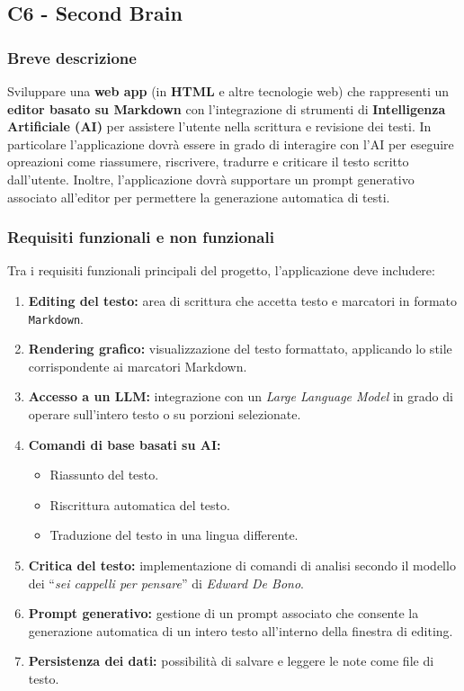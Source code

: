 \documentclass[a4paper,11pt]{article}
\begin{document}
\subsection{C6 - Second Brain}

\subsubsection{Breve descrizione}
Sviluppare una \textbf{web app} (in \textbf{HTML} e altre tecnologie web) che rappresenti un \textbf{editor basato su Markdown} con l’integrazione di strumenti di \textbf{Intelligenza Artificiale (AI)} per assistere l’utente nella scrittura e revisione dei testi.
In particolare l'applicazione dovrà essere in grado di interagire con l'AI per eseguire opreazioni come riassumere, riscrivere, tradurre e criticare il testo scritto dall'utente. Inoltre, l'applicazione dovrà supportare un prompt generativo associato all'editor per permettere la generazione automatica di testi.
\subsubsection{Requisiti funzionali e non funzionali}
Tra i requisiti funzionali principali del progetto, l'applicazione deve includere:
\begin{enumerate}[noitemsep, topsep=0pt]
  \item \textbf{Editing del testo:} area di scrittura che accetta testo e marcatori in formato \texttt{Markdown}.
  \item \textbf{Rendering grafico:} visualizzazione del testo formattato, applicando lo stile corrispondente ai marcatori Markdown.
  \item \textbf{Accesso a un LLM:} integrazione con un \textit{Large Language Model} in grado di operare sull’intero testo o su porzioni selezionate.
  \item \textbf{Comandi di base basati su AI:}
  \begin{itemize}
    \item Riassunto del testo.
    \item Riscrittura automatica del testo.
    \item Traduzione del testo in una lingua differente.
  \end{itemize}
  
  \item \textbf{Critica del testo:} implementazione di comandi di analisi secondo il modello dei “\textit{sei cappelli per pensare}” di \textit{Edward De Bono}.
  \item \textbf{Prompt generativo:} gestione di un prompt associato che consente la generazione automatica di un intero testo all’interno della finestra di editing.
  \item \textbf{Persistenza dei dati:} possibilità di salvare e leggere le note come file di testo.
\end{enumerate}
\end{document}
